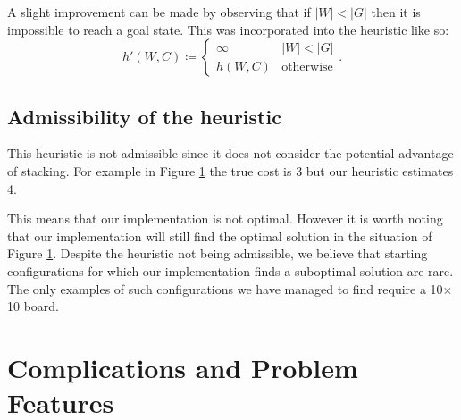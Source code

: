 \documentclass[11pt]{article}
\newcommand{\white}[3] {
  \foreach \x in {0, ..., #3} {
    \draw[fill=white] ({.5+#1},{\x*.1+.5+#2}) circle (0.42) node {#3};
  }
}
\newcommand{\black}[3] {
  \foreach \x in {0, ..., #3} {
    \draw[fill=white!70!black] ({.5+#1},{\x*.1+.5+#2}) circle (0.42) node {#3};
  }
}
\theoremstyle{definition}
\def\defeq{\coloneqq}
\begin{document}
    A slight improvement can be made by observing that if $|W| < |G|$ then it is impossible to reach a goal state. This was incorporated into the heuristic like so:
    \[
        h'(W, C) \defeq \begin{cases}
            \infty & |W| < |G|\\
            h(W, C) & \textrm{otherwise}
        \end{cases}. 
    \]

    \subsection{Admissibility of the heuristic}
    This heuristic is not admissible since it does not consider the potential advantage of stacking. For example in Figure \ref{fig:inadmissable-heuristic} the true cost is $3$ but our heuristic estimates 4.
    \begin{figure}[ht!]
        \centering
        \caption{}
        \label{fig:inadmissable-heuristic}
    \end{figure}
    This means that our implementation is not optimal. However it is worth noting that our implementation will still find the optimal solution in the situation of Figure \ref{fig:inadmissable-heuristic}. Despite the heuristic not being admissible, we believe that starting configurations for which our implementation finds a suboptimal solution are rare. The only examples of such configurations we have managed to find require a 10$\times$10 board.
    \section{Complications and Problem Features}
\end{document}
